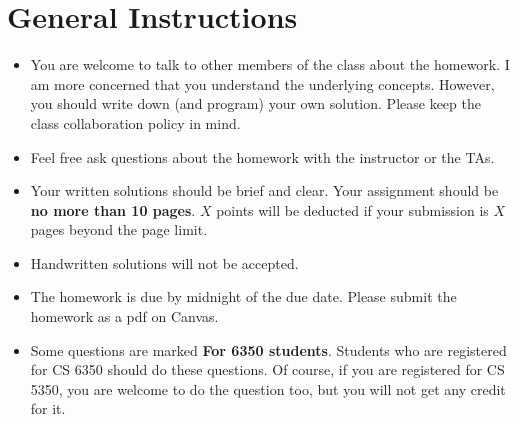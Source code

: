 \section*{General Instructions}

{\footnotesize
  \begin{itemize}
  \item You are welcome to talk to other members of the class about
    the homework. I am more concerned that you understand the
    underlying concepts. However, you should write down (and program)
    your own solution. Please keep the class collaboration policy in
    mind.

  \item Feel free ask questions about the homework with the instructor
    or the TAs.

  \item Your written solutions should be brief and clear. Your
    assignment should be {\bf no more than 10 pages}. $X$ points will
    be deducted if your submission is $X$ pages beyond the page limit.

  \item Handwritten solutions will not be accepted.

  \item The homework is due by midnight of the due date. Please submit
    the homework as a pdf on Canvas.

  \item Some questions are marked {\bf For 6350 students}. Students
    who are registered for CS 6350 should do these questions. Of
    course, if you are registered for CS 5350, you are welcome to do
    the question too, but you will not get any credit for it.

  \end{itemize}
}

